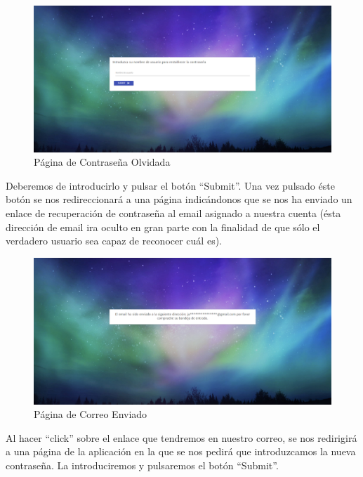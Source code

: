 \documentclass[11pt,openany]{book}
\begin{document}
\begin{figure}[H]
\centering
\includegraphics[totalheight=6cm]{manualUsuario/contrase_aOlvidada.png}
\caption{Página de Contraseña Olvidada}
\end{figure}

Deberemos de introducirlo y pulsar el botón ``Submit''. Una vez pulsado éste botón se nos redireccionará a una página indicándonos que se nos ha enviado un enlace de recuperación de contraseña al email asignado a nuestra cuenta (ésta dirección de email ira oculto en gran parte con la finalidad de que sólo el verdadero usuario sea capaz de reconocer cuál es).

\begin{figure}[H]
\centering
\includegraphics[totalheight=6cm]{manualUsuario/correoEnviado.png}
\caption{Página de Correo Enviado}
\end{figure}

\pagebreak
Al hacer ``click'' sobre el enlace que tendremos en nuestro correo, se nos redirigirá a una página de la aplicación en la que se nos pedirá que introduzcamos la nueva contraseña. La introduciremos y pulsaremos el botón ``Submit''. 
\end{document}
